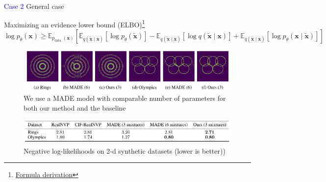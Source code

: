 \documentclass[t]{beamer}  %
\begin{document}
\begin{frame}
\textcolor{blue}{Case 2} General case
\begin{block}{Maximizing an evidence lower bound (ELBO)\footnote{\href{https://lilianweng.github.io/lil-log/2018/08/12/from-autoencoder-to-beta-vae.html#autoencoder}{Formula derivation}}}
\footnotesize
$
\log p_{\theta}(\bm{x}) \geq \mathbb{E}_{p_{\text {data }}(\bm{x})}\left[\mathbb{E}_{q(\tilde{\bm{x}} \mid \bm{x})}\left[\log p_{\theta}(\tilde{\bm{x}})\right]-\mathbb{E}_{q(\tilde{\bm{x}} \mid \bm{x})}[\log q(\tilde{\bm{x}} \mid \bm{x})]+\mathbb{E}_{q(\tilde{\bm{x}} \mid \bm{x})}\left[\log p_{\theta}(\bm{x} \mid \tilde{\bm{x}})\right]\right]
$
\end{block}
\begin{figure}[h]
    \centering
    
    \includegraphics[width=\textwidth]{rings.pdf}
    \caption[c]{We use a MADE model with comparable number of parameters for both our method and the baseline}
\end{figure}
\begin{figure}[h]
    \centering
    
    \includegraphics[width=\textwidth]{nll_rings.pdf}
    \caption[c]{Negative  log-likelihoods  on  2-d  synthetic  datasets  (lower  is  better)) }
\end{figure}
\end{frame}
\end{document}
